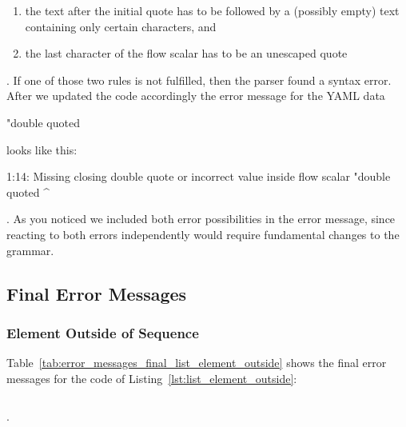 \begin{enumerate}
  \item the text after the initial quote has to be followed by a (possibly empty) text containing only certain characters, and
  \item the last character of the flow scalar has to be an unescaped quote
\end{enumerate}

. If one of those two rules is not fulfilled, then the parser found a syntax error. After we updated the code accordingly the error message for the YAML data

\begin{yamlcode}
  "double quoted
\end{yamlcode}

looks like this:

\begin{textcode}
  1:14: Missing closing double quote or
        incorrect value inside flow scalar
        "double quoted
                      ^
\end{textcode}

. As you noticed we included both error possibilities in the error message, since reacting to both errors independently would require fundamental changes to the grammar.

\subsection{Final Error Messages}

\subsubsection{Element Outside of Sequence}

Table~\ref{tab:error_messages_final_list_element_outside} shows the final error messages for the code of Listing~\ref{lst:list_element_outside}:

\begin{code-boxed}
  \inputminted[linenos]{yaml}{Data/Errors/list_element_outside.yaml}
\end{code-boxed}

.

